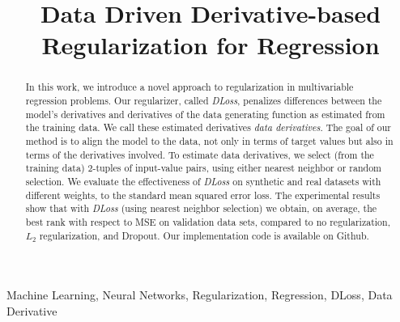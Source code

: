 \documentclass[conference]{IEEEtran}
\begin{document}
\title{Data Driven Derivative-based Regularization for Regression}

\author{

\and 

\and 

\and 


\and 



}

\maketitle



\begin{IEEEkeywords}
Machine Learning, Neural Networks, Regularization, Regression, DLoss, Data Derivative
\end{IEEEkeywords}


\begin{abstract}
In this work, we introduce a novel approach to regularization in multivariable regression problems. 
Our regularizer, called \emph{DLoss}, penalizes differences between the model's derivatives and derivatives of the data generating function as estimated from the training data. 
We call these estimated derivatives \emph{data derivatives}. 
The goal of our method is to align the model to the data, not only in terms of target values but also in terms of the derivatives involved. 
To estimate data derivatives, we select (from the training data) 2-tuples of input-value pairs, using either nearest neighbor or random selection. 
We evaluate the effectiveness of \emph{DLoss} on synthetic and real datasets with different weights, to the standard mean squared error loss. 
The experimental results show that with \emph{DLoss} (using nearest neighbor selection) we obtain, on average, the best rank with respect to MSE on validation data sets, compared to no regularization, $L_2$ regularization, and Dropout. 
Our implementation code is available on Github.
\end{abstract}
\end{document}

